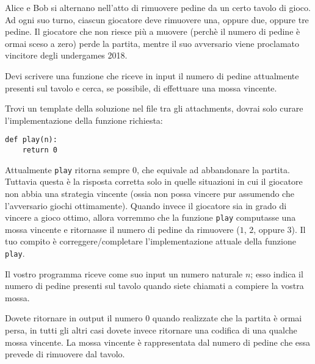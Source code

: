 \renewcommand{\nomebreve}{game123}
\renewcommand{\titolo}{Uno, due, o tre passi?}

\introduzione{}

Alice e Bob si alternano nell'atto di rimuovere pedine da un certo tavolo di gioco.
Ad ogni suo turno, ciascun giocatore deve rimuovere una, oppure due, oppure tre pedine.
Il giocatore che non riesce più a muovere (perchè il numero di pedine è ormai sceso a zero) perde la partita, mentre il suo avversario viene proclamato vincitore degli undergames 2018.

Devi scrivere una funzione che riceve in input il numero di pedine attualmente presenti sul tavolo e cerca, se possibile, di effettuare una mossa vincente.

Trovi un template della soluzione nel file \textbf{} tra gli attachments, dovrai solo curare l'implementazione della funzione richiesta:

\begin{verbatim}
def play(n):
    return 0
\end{verbatim}

Attualmente {\tt play} ritorna sempre $0$, che equivale ad abbandonare la partita. Tuttavia questa è la risposta corretta solo in quelle situazioni in cui il giocatore non abbia una strategia vincente (ossia non possa vincere pur assumendo che l'avversario giochi ottimamente). Quando invece il giocatore sia in grado di vincere a gioco ottimo, allora vorremmo che la funzione {\tt play} computasse una mossa vincente e ritornasse il numero di pedine da rimuovere ($1$, $2$, oppure $3$). Il tuo compito è correggere/completare l'implementazione attuale della funzione {\tt play}. 


Il vostro programma riceve come suo input un numero naturale $n$; esso indica il numero di pedine presenti sul tavolo quando siete chiamati a compiere la vostra mossa.


Dovete ritornare in output il numero $0$ quando realizzate che la partita è ormai persa, in tutti gli altri casi dovete invece ritornare una codifica di una qualche mossa vincente. La mossa vincente è rappresentata dal numero di pedine che essa prevede di rimuovere dal tavolo.




